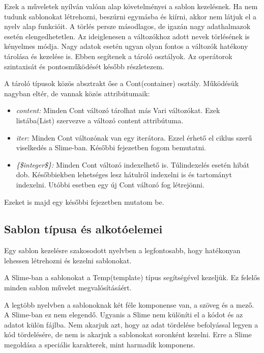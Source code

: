 Ezek a műveletek nyílván valóan alap követelményei a sablon kezelésnek. 
Ha nem tudunk sablonokat létrehozni, beszúrni egymásba és kiírni, akkor nem látjuk el a nyelv alap funkcióit.
A törlés persze másodlagos, de igazán nagy adathalmazok esetén elengedhetetlen.
Az ideiglenesen a változókhoz adott nevek törlésének is kényelmes módja.
Nagy adatok esetén ugyan olyan fontos a változók hatékony tárolása és kezelése is.
Ebben segítenek a tároló osztályok.
Az operátorok szintaxisát és pontosműködését később részletezem. 

A tároló típusok közös absztrakt őse a Cont(container) osztály.
Működésük nagyban eltér, de vannak közös attribútumaik:
\begin{itemize}
\item \emph{content:} 
Minden Cont változó tárolhat más Vari változókat.
Ezek listába(List) szervezve a változó content attribútuma.
\item \emph{iter:} 
Minden Cont változónak van egy iterátora.
Ezzel érhető el ciklus szerű viselkedés a Slime-ban.
Későbbi fejezetben fogom bemutatni.
\item \emph{\{\$integer\$\}:} 
Minden Cont változó indexelhető is.
Túlindexelés esetén hibát dob.
Későbbiekben lehetséges lesz hátulról indexelni is és tartományt indexelni.
Utóbbi esetben egy új Cont változó fog létrejönni.
\end{itemize}

Ezeket is majd egy későbbi fejezetben mutatom be.

\subsection{Sablon típusa és alkotóelemei}
Egy sablon kezelésre szakosodott nyelvben a legfontosabb, hogy hatékonyan lehessen létrehozni és kezelni sablonokat.

A Slime-ban a sablonokat a Temp(template) típus segítségével kezeljük. Ez felelős minden sablon művelet megvalósításáért.

A legtöbb nyelvben a sablonoknak két féle komponense van, a szöveg és a mező. 
A Slime-ban ez nem elegendő.
Ugyanis a Slime nem különíti el a kódot és az adatot külön fájlba.
Nem akarjuk azt, hogy az adat tördelése befolyással legyen a kód tördelésére, de nem is akarjuk a sablonokat soronként kezelni.
Erre a Slime megoldása a speciális karakterek, mint harmadik komponens.

